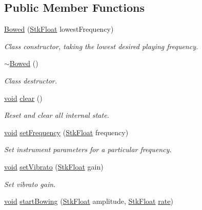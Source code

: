 \subsection*{Public Member Functions}
\begin{DoxyCompactItemize}
\item 
\hyperlink{class_nyq_1_1_bowed_a60810f94930baddc2c21d0098472bd05}{Bowed} (\hyperlink{namespace_nyq_a044fa20a706520a617bbbf458a7db7e4}{Stk\+Float} lowest\+Frequency)
\begin{DoxyCompactList}\small\item\em Class constructor, taking the lowest desired playing frequency. \end{DoxyCompactList}\item 
\hyperlink{class_nyq_1_1_bowed_abac170f66abaf506d8ef0a2b2c75e06a}{$\sim$\+Bowed} ()
\begin{DoxyCompactList}\small\item\em Class destructor. \end{DoxyCompactList}\item 
\hyperlink{sound_8c_ae35f5844602719cf66324f4de2a658b3}{void} \hyperlink{class_nyq_1_1_bowed_a5ac2cc30875e8c54fc86d0dc3f4c7968}{clear} ()
\begin{DoxyCompactList}\small\item\em Reset and clear all internal state. \end{DoxyCompactList}\item 
\hyperlink{sound_8c_ae35f5844602719cf66324f4de2a658b3}{void} \hyperlink{class_nyq_1_1_bowed_a2dead6ae601a924d8d543a62a9c29d02}{set\+Frequency} (\hyperlink{namespace_nyq_a044fa20a706520a617bbbf458a7db7e4}{Stk\+Float} frequency)
\begin{DoxyCompactList}\small\item\em Set instrument parameters for a particular frequency. \end{DoxyCompactList}\item 
\hyperlink{sound_8c_ae35f5844602719cf66324f4de2a658b3}{void} \hyperlink{class_nyq_1_1_bowed_aeb265f9e68b348781014a15bf877ccde}{set\+Vibrato} (\hyperlink{namespace_nyq_a044fa20a706520a617bbbf458a7db7e4}{Stk\+Float} gain)
\begin{DoxyCompactList}\small\item\em Set vibrato gain. \end{DoxyCompactList}\item 
\hyperlink{sound_8c_ae35f5844602719cf66324f4de2a658b3}{void} \hyperlink{class_nyq_1_1_bowed_a0e451c1906ed53827c067ef421d42795}{start\+Bowing} (\hyperlink{namespace_nyq_a044fa20a706520a617bbbf458a7db7e4}{Stk\+Float} amplitude, \hyperlink{namespace_nyq_a044fa20a706520a617bbbf458a7db7e4}{Stk\+Float} \hyperlink{seqread_8c_ad89d3fac2deab7a9cf6cfc8d15341b85}{rate})

\end{DoxyCompactItemize}
